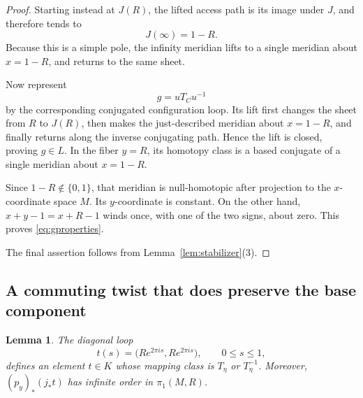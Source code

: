 \documentclass[11pt]{article}
\newtheorem{lemma}[theorem]{Lemma}
\theoremstyle{definition}
\theoremstyle{remark}
\begin{document}
\begin{proof}
Starting instead at $J(R)$, the lifted access path is its image under
$J$, and therefore tends to
\[
J(\infty)=1-R.
\]
Because this is a simple pole, the infinity meridian lifts to a
single meridian about $x=1-R$, and returns to the same sheet.

Now represent
\[
g=uT_Cu^{-1}
\]
by the corresponding conjugated configuration loop.  Its lift first
changes the sheet from $R$ to $J(R)$, then makes the just-described
meridian about $x=1-R$, and finally returns along the inverse
conjugating path.  Hence the lift is closed, proving $g\in L$.
In the fiber $y=R$, its homotopy class is a based conjugate of a
single meridian about $x=1-R$.

Since $1-R\notin\{0,1\}$, that meridian is null-homotopic after
projection to the $x$-coordinate space $M$.  Its $y$-coordinate is
constant.  On the other hand, $x+y-1=x+R-1$ winds once, with one of
the two signs, about zero.  This proves \eqref{eq:gproperties}.

The final assertion follows from Lemma~\ref{lem:stabilizer}(3).
\end{proof}

\subsection{A commuting twist that does preserve the base component}

\begin{lemma}\label{lem:cusp}
The diagonal loop
\begin{equation}\label{eq:tloop}
t(s)=\bigl(Re^{2\pi is},Re^{2\pi is}\bigr),
\qquad 0\le s\le1,
\end{equation}
defines an element $t\in K$ whose mapping class is
$T_\eta$ or $T_\eta^{-1}$.
Moreover, $(p_y)_*(j_*t)$ has infinite order in $\pi_1(M,R)$.
\end{lemma}
\end{document}
